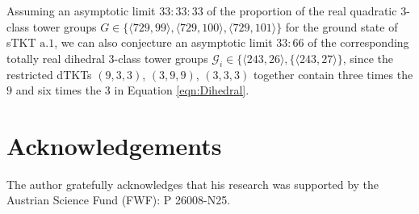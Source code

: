 \documentclass{amsart}
\theoremstyle{definition}
\numberwithin{equation}{section}
\begin{document}
\noindent
Assuming an asymptotic limit \(33:33:33\) of the proportion of the real quadratic \(3\)-class tower groups
\(G\in\lbrace\langle 729,99\rangle,\langle 729,100\rangle,\langle 729,101\rangle\rbrace\)
for the ground state of sTKT \(\mathrm{a}.1\),
we can also conjecture an asymptotic limit \(33:66\) of the corresponding totally real dihedral \(3\)-class tower groups
\(\mathcal{G}_i\in\lbrace\langle 243,26\rangle,\lbrace\langle 243,27\rangle\rbrace\),
since the restricted dTKTs \((9,3,3)\), \((3,9,9)\), \((3,3,3)\) together contain
three times the \(9\) and six times the \(3\) in Equation
\eqref{eqn:Dihedral}.



\section{Acknowledgements}
\label{s:Acknowledgements}

\noindent
The author gratefully acknowledges that his research was supported
by the Austrian Science Fund (FWF): P 26008-N25.


\end{document}
